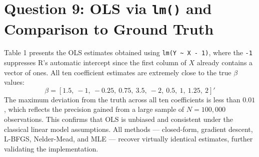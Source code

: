 \documentclass{article}
\begin{document}
\section*{Question 9: OLS via \texttt{lm()} and Comparison to Ground Truth}
Table 1 presents the OLS estimates obtained using \texttt{lm(Y \textasciitilde\ X - 1)}, 
where the \texttt{-1} suppresses R's automatic intercept since the first column of $X$ 
already contains a vector of ones. All ten coefficient estimates are extremely close 
to the true $\beta$ values:
\[
\beta = [1.5,\ -1,\ -0.25,\ 0.75,\ 3.5,\ -2,\ 0.5,\ 1,\ 1.25,\ 2]'
\]
The maximum deviation from the truth across all ten coefficients is less than $0.01$, 
which reflects the precision gained from a large sample of $N = 100{,}000$ observations. 
This confirms that OLS is unbiased and consistent under the classical linear model 
assumptions. All methods --- closed-form, gradient descent, L-BFGS, Nelder-Mead, 
and MLE --- recover virtually identical estimates, further validating the implementation.


\end{document}

